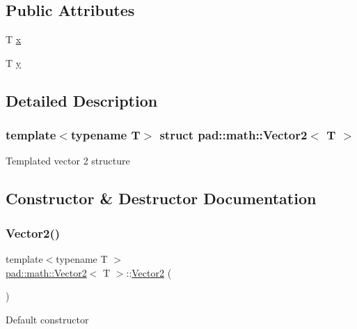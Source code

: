 \subsection*{Public Attributes}
\begin{DoxyCompactItemize}
\item 
T \mbox{\hyperlink{structpad_1_1math_1_1_vector2_a3d4fc9deec4a8fd923ea4f5f73dfb763}{x}}
\item 
T \mbox{\hyperlink{structpad_1_1math_1_1_vector2_a481eca28456d2e02f635059d379b89f5}{y}}
\end{DoxyCompactItemize}


\subsection{Detailed Description}
\subsubsection*{template$<$typename T$>$\newline
struct pad\+::math\+::\+Vector2$<$ T $>$}

Templated vector 2 structure 

\subsection{Constructor \& Destructor Documentation}
\mbox{\label{structpad_1_1math_1_1_vector2_afaa3496649b893db8720d87c9dc4f03f}} 
\subsubsection{\texorpdfstring{Vector2()}{Vector2()}\hspace{0.1cm}{\footnotesize\ttfamily [1/4]}}
{\footnotesize\ttfamily template$<$typename T $>$ \\
\mbox{\hyperlink{structpad_1_1math_1_1_vector2}{pad\+::math\+::\+Vector2}}$<$ T $>$\+::\mbox{\hyperlink{structpad_1_1math_1_1_vector2}{Vector2}} (\begin{DoxyParamCaption}{ }\end{DoxyParamCaption})}

Default constructor \mbox{\label{structpad_1_1math_1_1_vector2_ab21c64ccea2b5c873a9edf99c452e5a8}} 
